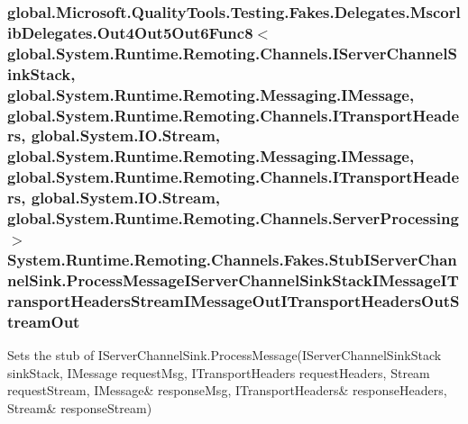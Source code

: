 \hypertarget{class_system_1_1_runtime_1_1_remoting_1_1_channels_1_1_fakes_1_1_stub_i_server_channel_sink_a5fb09d80d67a19de42626b108e3e964b}{
\subsubsection[{Process\-Message\-I\-Server\-Channel\-Sink\-Stack\-I\-Message\-I\-Transport\-Headers\-Stream\-I\-Message\-Out\-I\-Transport\-Headers\-Out\-Stream\-Out}]{\setlength{\rightskip}{0pt plus 5cm}global.\-Microsoft.\-Quality\-Tools.\-Testing.\-Fakes.\-Delegates.\-Mscorlib\-Delegates.\-Out4\-Out5\-Out6\-Func8$<$global.\-System.\-Runtime.\-Remoting.\-Channels.\-I\-Server\-Channel\-Sink\-Stack, global.\-System.\-Runtime.\-Remoting.\-Messaging.\-I\-Message, global.\-System.\-Runtime.\-Remoting.\-Channels.\-I\-Transport\-Headers, global.\-System.\-I\-O.\-Stream, global.\-System.\-Runtime.\-Remoting.\-Messaging.\-I\-Message, global.\-System.\-Runtime.\-Remoting.\-Channels.\-I\-Transport\-Headers, global.\-System.\-I\-O.\-Stream, global.\-System.\-Runtime.\-Remoting.\-Channels.\-Server\-Processing$>$ System.\-Runtime.\-Remoting.\-Channels.\-Fakes.\-Stub\-I\-Server\-Channel\-Sink.\-Process\-Message\-I\-Server\-Channel\-Sink\-Stack\-I\-Message\-I\-Transport\-Headers\-Stream\-I\-Message\-Out\-I\-Transport\-Headers\-Out\-Stream\-Out}}\label{class_system_1_1_runtime_1_1_remoting_1_1_channels_1_1_fakes_1_1_stub_i_server_channel_sink_a5fb09d80d67a19de42626b108e3e964b}


Sets the stub of I\-Server\-Channel\-Sink.\-Process\-Message(I\-Server\-Channel\-Sink\-Stack sink\-Stack, I\-Message request\-Msg, I\-Transport\-Headers request\-Headers, Stream request\-Stream, I\-Message\& response\-Msg, I\-Transport\-Headers\& response\-Headers, Stream\& response\-Stream)

